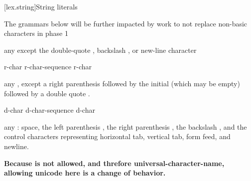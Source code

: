 \documentclass{wg21}
\begin{document}
[lex.string]{String literals}


\begin{quoteblock}
The grammars below will be further impacted by work to not replace non-basic characters in phase 1
\end{quoteblock}

\begin{bnf}
\br
\textnormal{any  except the double-quote , backslash \terminal{\textbackslash}, or new-line character}
\end{bnf}

\begin{bnf}
    \br
      \terminal{(}  \terminal{)}  
\end{bnf}

\begin{bnf}
    \br
    r-char\br
    r-char-sequence r-char
\end{bnf}

\begin{bnf}
    \br
    \textnormal{any , except a right parenthesis \terminal{)} followed by}\br
    \bnfindent\textnormal{the initial  (which may be empty) followed by a double quote .}
\end{bnf}

\begin{bnf}
    \br
    d-char\br
    d-char-sequence d-char
\end{bnf}


\begin{bnf}
    \br
    \textnormal{any  :}\br
    \bnfindent\textnormal{space, the left parenthesis \terminal{(}, the right parenthesis \terminal{)}, the backslash \terminal{\textbackslash}, and the control characters}\br
    \bnfindent\textnormal{representing horizontal tab, vertical tab, form feed, and newline.}
\end{bnf}

\begin{quoteblock}
\textbf{Because \tcode{\textbackslash} is not allowed, and threfore universal-character-name, allowing unicode here is a change of behavior.}
\end{quoteblock}
\end{document}
